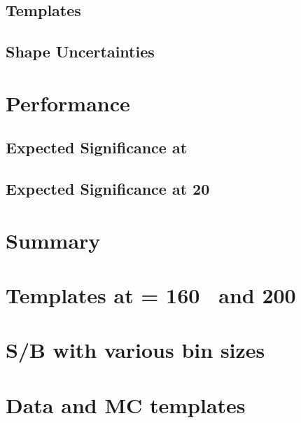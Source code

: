 \documentclass{cmspaper}
\begin{document}
  \subsection{Templates}
  \label{sec:templates}
  
  
  \subsection{Shape Uncertainties}
  \label{sec:shape_uncert}
  

%
\newpage
\section{Performance}
  \label{sec:performance}
  
  
  \subsection{Expected Significance at \intlumiEightTeV }
  \label{sec:exp_significance_5fb}
  
  
  \newpage
  \subsection{Expected Significance at 20~\ifb }
  \label{sec:exp_significance_20fb}
  

%
\newpage
\section{Summary}
     \label{sec:summary}
     



\clearpage 
\appendix
\appendixpage
  \section{Templates at \mHi = 160 \GeV~and 200 \GeV}
     \label{app:templates_more}
     
  
  \newpage
  \section{S/B with various bin sizes}
     \label{app:binsize}
     
  
  \newpage
  \section{Data and MC templates}
     \label{app:templates_eyefit}
     
\end{document}
